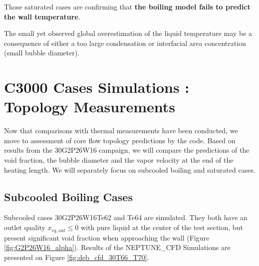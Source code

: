 \npar

Those saturated cases are confirming that \textbf{the boiling model fails to predict the wall temperature}. 


\begin{remark*}{}
The small yet observed global overestimation of the liquid temperature may be a consequence of either a too large condensation or interfacial area concentration (\ie small bubble diameter). 
\end{remark*}




\section{C3000 Cases Simulations : Topology Measurements}
\label{sec:deb_cfd_c30}

Now that comparisons with thermal measurements have been conducted, we move to assessment of core flow topology predictions by the code. Based on results from the 30G2P26W16 campaign, we will compare the predictions of the void fraction, the bubble diameter and the vapor velocity at the end of the heating length. We will separately focus on subcooled boiling and saturated cases.


\subsection{Subcooled Boiling Cases}

Subcooled cases 30G2P26W16Te62 and Te64 are simulated. They both have an outlet quality $x_{eq,out} \leq 0$ with pure liquid at the center of the test section, but present significant void fraction when approaching the wall (Figure \ref{fig:G2P26W16_alpha}). Results of the NEPTUNE\_CFD Simulations are presented on Figure \ref{fig:deb_cfd_30T66_T70}.

